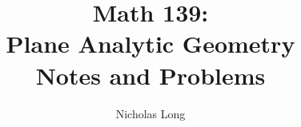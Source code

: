 


%
\InstructorVersion
%

\newcommand\bq{\begin{question}}
\newcommand\eq{\end{question}}
\newcommand\be{\begin{enumerate}}
\newcommand\ee{\end{enumerate}}
\renewcommand{\labelenumi}{\alph{enumi})}



\large
\frontmatter
\title{Math 139: \\ Plane Analytic Geometry \\ Notes and Problems}
\author{Nicholas Long}
\maketitle

